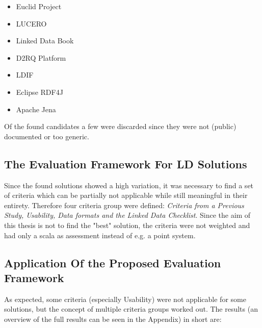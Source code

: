 \begin{itemize}
\itemsep0pt
\item Euclid Project
\item LUCERO
\item Linked Data Book
\item D2RQ Platform
\item LDIF
\item Eclipse RDF4J
\item Apache Jena
\end{itemize}

Of the found candidates a few were discarded since they were not (public) 
documented or too generic.

\subsection{The Evaluation Framework For LD Solutions}

Since the found solutions showed a high variation, it was necessary to find a set 
of criteria which can be partially not applicable while still meaningful in their 
entirety. Therefore four criteria group were defined: \textit{Criteria from a 
Previous Study, Usability, Data formats and the Linked Data Checklist}. Since the 
aim of this thesis is not to find the "best" solution, the criteria were not 
weighted and had only a scala as assessment instead of e.g. a point system.

\subsection{Application Of the Proposed Evaluation Framework}

As expected, some criteria (especially Usability) were not applicable for some 
solutions, but the concept of multiple criteria groups worked out. The results (an 
overview of the full results can be seen in the Appendix) in short are:

